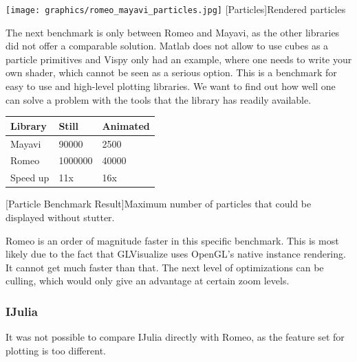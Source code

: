 \begin{minipage}{\linewidth}
    \centering
    \texttt{[image: graphics/romeo\_mayavi\_particles.jpg]}
    [Particles]{Rendered particles}
    \label{fig:reactive1}
\end{minipage}

The next benchmark is only between Romeo and Mayavi, as the other libraries did not offer a comparable solution. Matlab does not allow to use cubes as a particle primitives and Vispy only had an example, where one needs to write your own shader, which cannot be seen as a serious option. This is a benchmark for easy to use and high-level plotting libraries. We want to find out how well one can solve a problem with the tools that the library has readily available.

\begin{table}[htbp]
    \centering
    \begin{tabular}{l|l|l}
        \hline
        \textbf{Library} & \textbf{Still}  & \textbf{Animated}  \\ 
        \hline
        Mayavi           & 90000           & 2500  \\
        Romeo            & 1000000         & 40000 \\
        \hline
        \hline
        Speed up         & 11x             & 16x \\
    \end{tabular}
    [Particle Benchmark Result]{Maximum number of particles that could be displayed without stutter.}
    \label{table:relativespeedoglw}
\end{table}

Romeo is an order of magnitude faster in this specific benchmark. This is most likely due to the fact that GLVisualize uses OpenGL's native instance rendering.
It cannot get much faster than that. The next level of optimizations can be culling, which would only give an advantage at certain zoom levels.

\subsubsection{IJulia}

It was not possible to compare IJulia directly with Romeo, as the feature set for plotting is too different.

